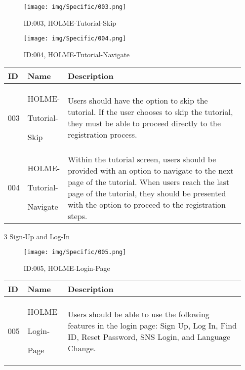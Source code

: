 \documentclass[conference]{IEEEtran}
\begin{document}
\begin{enumerate}
\vspace{1cm}

\begin{figure}[h]
\centering
\texttt{[image: img/Specific/003.png]}
\caption{ID:003, HOLME-Tutorial-Skip}
\vspace{0.5cm}
\texttt{[image: img/Specific/004.png]}
\caption{ID:004, HOLME-Tutorial-Navigate}
\end{figure}

\begin{table}[h]
\def\arraystretch{1.2} \small
    \begin{tabular}{|p{1cm}|p{1.8cm}|p{5.0cm}|}
        \hline
        ID & Name & Description\\ \hline
         003 \par  & HOLME-\par Tutorial-\par Skip &Users should have the option to skip the tutorial. If the user chooses to skip the tutorial, they must be able to proceed directly to the registration process.\\ \hline
         004 \par  & HOLME-\par Tutorial-\par Navigate &Within the tutorial screen, users should be provided with an option to navigate to the next page of the tutorial. When users reach the last page of the tutorial, they should be presented with the option to proceed to the registration steps.\\ \hline
    \end{tabular}
\end{table}
\clearpage


\item[3] Sign-Up and Log-In

\begin{figure}[h]
\centering
\texttt{[image: img/Specific/005.png]}
\caption{ID:005, HOLME-Login-Page}
\end{figure}

\begin{table}[h]
\def\arraystretch{1.2} \small
    \begin{tabular}{|p{1cm}|p{1.8cm}|p{5.0cm}|}
        \hline
        ID & Name & Description\\ \hline
         005 \par  & HOLME-\par Login-\par Page &Users should be able to use the following features in the login page: Sign Up, Log In, Find ID, Reset Password, SNS Login, and Language Change.\\ \hline
	\end{tabular}
\end{table}



\end{enumerate}
\end{document}
